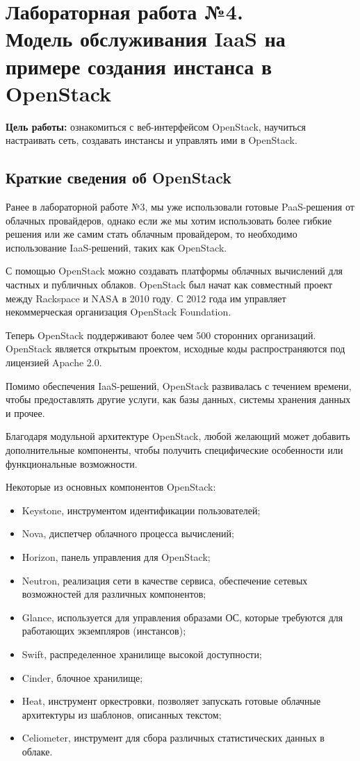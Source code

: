 \section[ЛР №4. Модель обслуживания IaaS, OpenStack]{Лабораторная работа №4. \\
Модель обслуживания IaaS на примере создания инстанса в OpenStack}

\textbf{Цель работы:} ознакомиться с веб-интерфейсом OpenStack, научиться настраивать сеть, создавать инстансы и управлять ими в OpenStack.

\subsection{Краткие сведения об OpenStack}

Ранее в лабораторной работе №3, мы уже использовали готовые PaaS-решения от облачных провайдеров, однако если же мы хотим использовать более гибкие решения или же самим стать облачным провайдером, то необходимо использование IaaS-решений, таких как OpenStack.

С помощью OpenStack можно создавать платформы облачных вычислений для частных и публичных облаков.
OpenStack был начат как совместный проект между Rackspace и NASA в 2010 году.
С 2012 года им управляет некоммерческая организация OpenStack Foundation.

Теперь OpenStack поддерживают более чем 500 сторонних организаций.
OpenStack является открытым проектом, исходные коды распространяются под лицензией Apache 2.0.

Помимо обеспечения IaaS-решений, OpenStack развивалась с течением времени, чтобы предоставлять другие услуги, как базы данных, системы хранения данных и прочее.

Благодаря модульной архитектуре OpenStack, любой желающий может добавить дополнительные компоненты, чтобы получить специфические особенности или функциональные возможности.

Некоторые из основных компонентов OpenStack:
\begin{itemize}
    \item Keystone, инструментом идентификации пользователей;
    \item Nova, диспетчер облачного процесса вычислений;
    \item Horizon, панель управления для OpenStack;
    \item Neutron, реализация сети в качестве сервиса, обеспечение сетевых возможностей для различных компонентов;
    \item Glance, используется для управления образами ОС, которые требуются для работающих экземпляров (инстансов);
    \item Swift, распределенное хранилище высокой доступности;
    \item Cinder, блочное хранилище;
    \item Heat, инструмент оркестровки, позволяет запускать готовые облачные архитектуры из шаблонов, описанных текстом;
    \item Celiometer, инструмент для сбора различных статистических данных в облаке.
\end{itemize}

